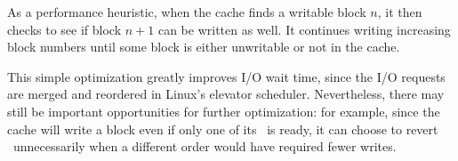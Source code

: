 As a performance heuristic, when the cache finds a writable block $n$, it
then checks to see if block $n+1$ can be written as
well.
%
It continues writing increasing block numbers until some block is either
unwritable or not in the cache.
%
\begin{comment}
The block itself is also marked \PInfst, so that only
one version of its data will be in flight at a time. (This whole procedure is
basically the buffer cache \textit{Write block} action.)
\end{comment}
%
This simple optimization greatly improves I/O wait time, since the I/O
requests are merged and reordered in Linux's elevator scheduler.
%
Nevertheless, there may still be important opportunities for further
optimization: for example, since the cache will write a block even if only
one of its \patches\ is ready, it can choose to revert \patches\
unnecessarily when a different order would have required fewer writes.


\begin{comment}
Each \patch\ on a cached block may or may not be visible to a given \module.
For example, \modules\ that respond to user requests generally view the most
current state of every block -- the block with all \patches\ applied. However, a
write-back cache may choose to write some \patches\ on a block while reverting
others, since those others currently have outstanding dependencies. In this
case, \modules\ below the write-back cache (i.e. closer to the disk) should view
those \patches\ in the reverted state. \Kudos\ provides a block revisioning
library function that automatically reverts those \patches\ that should not
be visible at a particular \module, and then re-applies them after that
\module\ is done with the block.
\end{comment}

